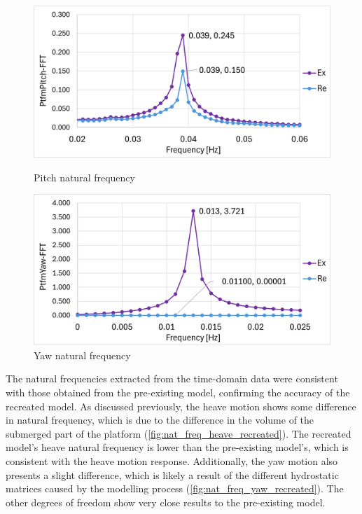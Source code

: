 \documentclass[a4paper, 11pt]{article}
\begin{document}
\begin{figure}[H]
    \begin{minipage}{0.47\textwidth}
        \centering
        \includegraphics[width=1\textwidth]{nat_freq_pitch_1.png}
        \caption{\small Pitch natural frequency}
        \label{fig:nat_freq_pitch_recreated}
    \end{minipage}
    \hfill
    \begin{minipage}{0.48\textwidth}
        \centering
        \includegraphics[width=1\textwidth]{nat_freq_yaw_1.png}
        \caption{\small Yaw natural frequency}
        \label{fig:nat_freq_yaw_recreated}
    \end{minipage}
\end{figure}


The natural frequencies extracted from the time-domain data were consistent with those obtained from the pre-existing model, confirming the accuracy of the recreated model. As discussed previously, the heave motion shows some difference in natural frequency, which is due to the difference in the volume of the submerged part of the platform (\autoref{fig:nat_freq_heave_recreated}). The recreated model's heave natural frequency is lower than the pre-existing model's, which is consistent with the heave motion response. Additionally, the yaw motion also presents a slight difference, which is likely a result of the different hydrostatic matrices caused by the modelling process (\autoref{fig:nat_freq_yaw_recreated}). The other degrees of freedom show very close results to the pre-existing model.
\end{document}
